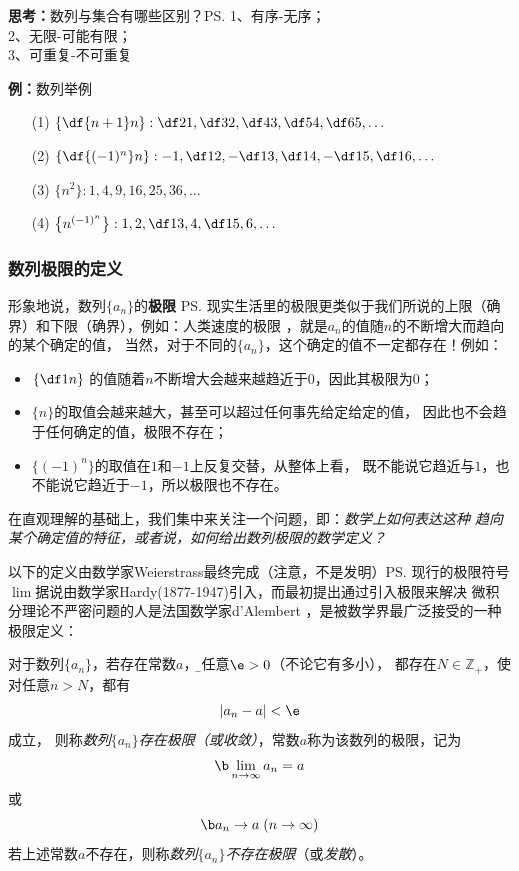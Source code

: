 {\bf 思考：}数列与集合有哪些区别？\ps{1、有序-无序；\\ 2、无限-可能有限；\\ 3、可重复-不可重复}

{\bf 例：}数列举例

\begin{enumerate}[(1)]
  \setlength{\itemindent}{1cm}
  \item[(1)] $\left\{\df{n+1}n\right\}:\df 21,\df 32,\df43,\df54,\df65,\ldots$
  \item[(2)] $\left\{\df{(-1)^n}n\right\}:-1,\df12,-\df13,\df14,-\df15,\df16,\ldots$
  \item[(3)] $\{n^2\}:1,4,9,16,25,36,\ldots$
  \item[(4)] $\left\{n^{(-1)^n}\right\}:1,2,\df13,4,\df15,6,\ldots$
\end{enumerate}

\subsubsection{数列极限的定义}

形象地说，数列$\{a_n\}$的{\bf 极限}
\ps{现实生活里的极限更类似于我们所说的上限（确界）和下限（确界），例如：人类速度的极限}
，就是$a_n$的值随$n$的不断增大而趋向的某个确定的值，
当然，对于不同的$\{a_n\}$，这个确定的值不一定都存在！例如：
\begin{itemize}
  \item $\left\{\df1n\right\}$
  的值随着$n$不断增大会越来越趋近于$0$，因此其极限为$0$；
  \item $\{n\}$的取值会越来越大，甚至可以超过任何事先给定给定的值，
  因此也不会趋于任何确定的值，极限不存在；
  \item $\{(-1)^n\}$的取值在$1$和$-1$上反复交替，从整体上看，
  既不能说它趋近与$1$，也不能说它趋近于$-1$，所以极限也不存在。
\end{itemize}

在直观理解的基础上，我们集中来关注一个问题，即：{\it 数学上如何表达这种
趋向某个确定值的特征，或者说，如何给出数列极限的数学定义？}

以下的定义由数学家Weierstrass最终完成（注意，不是发明）\ps{现行的极限符号
$\lim$据说由数学家Hardy(1877-1947)引入，而最初提出通过引入极限来解决
微积分理论不严密问题的人是法国数学家d'Alembert}
，是被数学界最广泛接受的一种极限定义：

\begin{thx}
	对于数列$\{a_n\}$，若存在常数$a$，{\b 对任意$\e>0$（不论它有多小），
	都存在$N\in\mathbb{Z}_+$，使对任意$n>N$，都有
	$$|a_n-a|<\e$$
	成立}，
	则称{\it 数列$\{a_n\}$存在极限（或收敛）}，常数$a$称为该数列的极限，记为
	$$\b\lim_{n\to\infty}a_n=a$$
	或%
	$$\b a_n\to a\;(n\to\infty)$$
	若上述常数$a$不存在，则称{\it 数列$\{a_n\}$不存在极限}（或{\it 发散}）。	
\end{thx}

